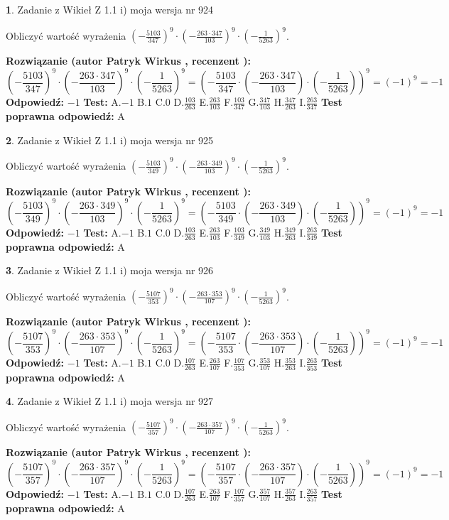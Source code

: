 \documentclass[12pt, a4paper]{article}
\theoremstyle{definition} %
\newtheorem{zad}{}
\newcommand{\zadStart}[1]{\begin{zad}#1\newline}
\newcommand{\zadStop}{\end{zad}}
\newcommand{\rozwStart}[2]{\noindent \textbf{Rozwiązanie (autor #1 , recenzent #2): }\newline}
\newcommand{\rozwStop}{\newline}
\newcommand{\odpStart}{\noindent \textbf{Odpowiedź:}\newline}
\newcommand{\odpStop}{\newline}
\newcommand{\testStart}{\noindent \textbf{Test:}\newline}
\newcommand{\testStop}{\newline}
\newcommand{\kluczStart}{\noindent \textbf{Test poprawna odpowiedź:}\newline}
\newcommand{\kluczStop}{\newline}
\begin{document}
\zadStart{Zadanie z Wikieł Z 1.1 i) moja wersja nr 924}

Obliczyć wartość wyrażenia $(-\frac{5103}{347})^{9} \cdot (-\frac{263 \cdot 347}{103})^{9} \cdot (-\frac{1}{5263})^{9}$.
\zadStop
\rozwStart{Patryk Wirkus}{}
$$(-\frac{5103}{347})^{9} \cdot (-\frac{263 \cdot 347}{103})^{9} \cdot (-\frac{1}{5263})^{9} = (-\frac{5103}{347} \cdot (-\frac{263 \cdot 347}{103}) \cdot (-\frac{1}{5263}))^{9} = (-1)^{9} = -1$$
\rozwStop
\odpStart
$-1$
\odpStop
\testStart
A.$-1$ B.$1$ C.$0$ D.$\frac{103}{263}$ E.$\frac{263}{103}$
F.$\frac{103}{347}$ G.$\frac{347}{103}$
H.$\frac{347}{263}$
I.$\frac{263}{347}$
\testStop
\kluczStart
A
\kluczStop



\zadStart{Zadanie z Wikieł Z 1.1 i) moja wersja nr 925}

Obliczyć wartość wyrażenia $(-\frac{5103}{349})^{9} \cdot (-\frac{263 \cdot 349}{103})^{9} \cdot (-\frac{1}{5263})^{9}$.
\zadStop
\rozwStart{Patryk Wirkus}{}
$$(-\frac{5103}{349})^{9} \cdot (-\frac{263 \cdot 349}{103})^{9} \cdot (-\frac{1}{5263})^{9} = (-\frac{5103}{349} \cdot (-\frac{263 \cdot 349}{103}) \cdot (-\frac{1}{5263}))^{9} = (-1)^{9} = -1$$
\rozwStop
\odpStart
$-1$
\odpStop
\testStart
A.$-1$ B.$1$ C.$0$ D.$\frac{103}{263}$ E.$\frac{263}{103}$
F.$\frac{103}{349}$ G.$\frac{349}{103}$
H.$\frac{349}{263}$
I.$\frac{263}{349}$
\testStop
\kluczStart
A
\kluczStop



\zadStart{Zadanie z Wikieł Z 1.1 i) moja wersja nr 926}

Obliczyć wartość wyrażenia $(-\frac{5107}{353})^{9} \cdot (-\frac{263 \cdot 353}{107})^{9} \cdot (-\frac{1}{5263})^{9}$.
\zadStop
\rozwStart{Patryk Wirkus}{}
$$(-\frac{5107}{353})^{9} \cdot (-\frac{263 \cdot 353}{107})^{9} \cdot (-\frac{1}{5263})^{9} = (-\frac{5107}{353} \cdot (-\frac{263 \cdot 353}{107}) \cdot (-\frac{1}{5263}))^{9} = (-1)^{9} = -1$$
\rozwStop
\odpStart
$-1$
\odpStop
\testStart
A.$-1$ B.$1$ C.$0$ D.$\frac{107}{263}$ E.$\frac{263}{107}$
F.$\frac{107}{353}$ G.$\frac{353}{107}$
H.$\frac{353}{263}$
I.$\frac{263}{353}$
\testStop
\kluczStart
A
\kluczStop



\zadStart{Zadanie z Wikieł Z 1.1 i) moja wersja nr 927}

Obliczyć wartość wyrażenia $(-\frac{5107}{357})^{9} \cdot (-\frac{263 \cdot 357}{107})^{9} \cdot (-\frac{1}{5263})^{9}$.
\zadStop
\rozwStart{Patryk Wirkus}{}
$$(-\frac{5107}{357})^{9} \cdot (-\frac{263 \cdot 357}{107})^{9} \cdot (-\frac{1}{5263})^{9} = (-\frac{5107}{357} \cdot (-\frac{263 \cdot 357}{107}) \cdot (-\frac{1}{5263}))^{9} = (-1)^{9} = -1$$
\rozwStop
\odpStart
$-1$
\odpStop
\testStart
A.$-1$ B.$1$ C.$0$ D.$\frac{107}{263}$ E.$\frac{263}{107}$
F.$\frac{107}{357}$ G.$\frac{357}{107}$
H.$\frac{357}{263}$
I.$\frac{263}{357}$
\testStop
\kluczStart
A
\kluczStop
\end{document}
